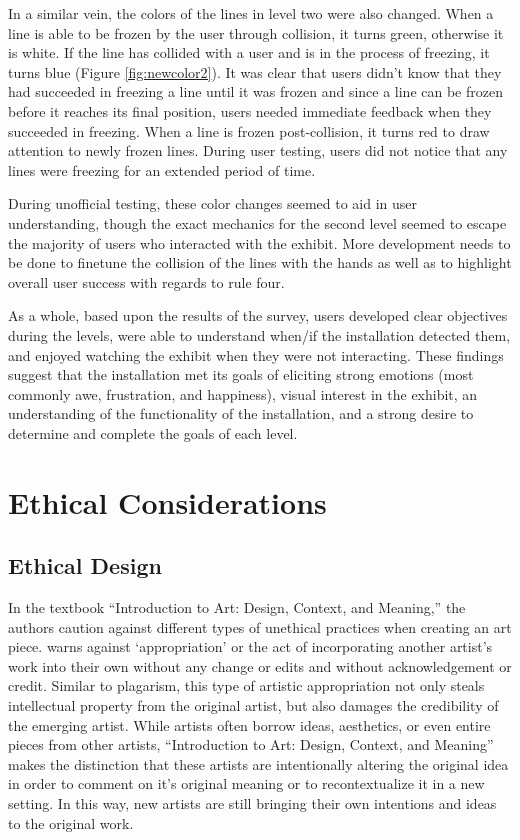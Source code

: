 \documentclass[10pt,twocolumn]{article}
\begin{document}
In a similar vein, the colors of the lines in level two were also changed.  When a line is able to be frozen by the user through collision, it turns green, otherwise it is white. If the line has collided with a user and is in the process of freezing, it turns blue (Figure \ref{fig:newcolor2}).  It was clear that users didn't know that they had succeeded in freezing a line until it was frozen and since a line can be frozen before it reaches its final position, users needed immediate feedback when they succeeded in freezing. When a line is frozen post-collision, it turns red to draw attention to newly frozen lines.  During user testing, users did not notice that any lines were freezing for an extended period of time. 

During unofficial testing, these color changes seemed to aid in user understanding, though the exact mechanics for the second level seemed to escape the majority of users who interacted with the exhibit. More development needs to be done to finetune the collision of the lines with the hands as well as to highlight overall user success with regards to rule four. 

As a whole, based upon the results of the survey,  users developed clear objectives during the levels, were able to understand when/if the installation detected them, and enjoyed watching the exhibit when they were not interacting. These findings suggest that the installation met its goals of eliciting strong emotions (most commonly awe, frustration, and happiness), visual interest in the exhibit, an understanding of the functionality of the installation, and a strong desire to determine and complete the goals of each level. 

\section{Ethical Considerations}

\subsection{Ethical Design}\label{sec:design}

In the textbook ``Introduction to Art: Design, Context, and Meaning,'' \cite{blood_introduction_nodate}the authors caution against different types of unethical practices when creating an art piece. \citeauthor{blood_introduction_nodate} warns against `appropriation' or the act of incorporating another artist's work into their own without any change or edits and without acknowledgement or credit. Similar to plagarism, this type of artistic appropriation not only steals intellectual property from the original artist, but also damages the credibility of the emerging artist.  While artists often borrow ideas, aesthetics, or even entire pieces from other artists, ``Introduction to Art: Design, Context, and Meaning'' makes the distinction that these artists are intentionally altering the original idea in order to comment on it's original meaning or to recontextualize it in a new setting. In this way, new artists are still bringing their own intentions and ideas to the original work.  
\end{document}
